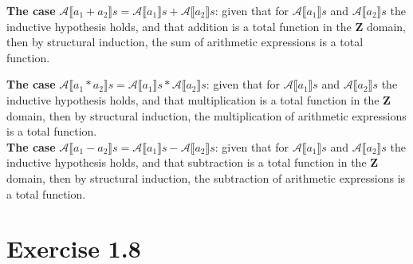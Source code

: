 \documentclass{article}
\begin{document}
\noindent \textbf{The case} $\mathcal{A}\llbracket a_1 + a_2 \rrbracket s = \mathcal{A}\llbracket a_1 \rrbracket s + \mathcal{A}\llbracket a_2 \rrbracket s$:
given that for $\mathcal{A}\llbracket a_1 \rrbracket s$ and $\mathcal{A}\llbracket a_2 \rrbracket s$ the inductive hypothesis holds, and that addition is a total function in the \textbf{Z} domain, then by structural induction, the sum of arithmetic expressions is a total function.

\noindent \textbf{The case} $\mathcal{A}\llbracket a_1 * a_2 \rrbracket s = \mathcal{A}\llbracket a_1 \rrbracket s * \mathcal{A}\llbracket a_2 \rrbracket s$:
given that for $\mathcal{A}\llbracket a_1 \rrbracket s$ and $\mathcal{A}\llbracket a_2 \rrbracket s$ the inductive hypothesis holds, and that multiplication is a total function in the \textbf{Z} domain, then by structural induction, the multiplication of arithmetic expressions is a total function. \\

\noindent \textbf{The case} $\mathcal{A}\llbracket a_1 - a_2 \rrbracket s = \mathcal{A}\llbracket a_1 \rrbracket s - \mathcal{A}\llbracket a_2 \rrbracket s$:
given that for $\mathcal{A}\llbracket a_1 \rrbracket s$ and $\mathcal{A}\llbracket a_2 \rrbracket s$ the inductive hypothesis holds, and that subtraction is a total function in the \textbf{Z} domain, then by structural induction, the subtraction of arithmetic expressions is a total function. \\

\section{Exercise 1.8}
\end{document}

